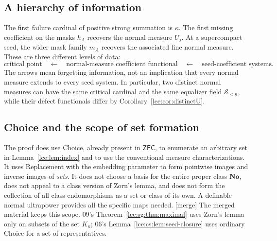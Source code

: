 \documentclass[11pt,letterpaper]{article}
\numberwithin{equation}{section}
\theoremstyle{definition}
\theoremstyle{remark}
\newcommand{\No}{\mathbf{No}}
\newcommand{\Sk}{\mathscr S_{<\kappa}}
\newcommand{\ZFC}{\mathsf{ZFC}}
\newcommand{\thref}[1]{Theorem~\ref{#1}}
\newcommand{\leref}[1]{Lemma~\ref{#1}}
\newcommand{\mergetag}{\textup{\textsf{\small[merge]}}}%
\begin{document}
\subsection{A hierarchy of information}
The first failure cardinal of positive strong summation is $\kappa$.
The first missing coefficient on the masks $h_A$ recovers the normal
measure $U_j$. At a supercompact seed, the wider mask family $m_A$
recovers the associated fine normal measure. These are three different
levels of data:
\[
 \text{critical point}
 \quad\longleftarrow\quad
 \text{normal-measure coefficient functional}
 \quad\longleftarrow\quad
 \text{seed-coefficient systems}.
\]
The arrows mean forgetting information, not an implication that every
normal measure extends to every seed system. In particular, two distinct
normal measures can have the same critical cardinal and the same equalizer
field $\Sk$, while their defect functionals differ by
Corollary~\ref{lce:cor:distinctU}.

\subsection{Choice and the scope of set formation}
The proof does use Choice, already present in $\ZFC$, to enumerate an
arbitrary set in \leref{lce:lem:index} and to use the conventional measure
characterizations. It uses Replacement with the embedding parameter to
form pointwise images and inverse images of \emph{sets}. It does not
choose a basis for the entire proper class $\No$, does not appeal to a
class version of Zorn's lemma, and does not form the collection of all
class endomorphisms as a set or class of its own. A definable normal
ultrapower provides all the specific maps needed.
\mergetag{} The merged material keeps this scope. 09's
\thref{lce:sg:thm:maximal} uses Zorn's lemma only on subsets of the set
$K_\kappa$; 06's \leref{lce:cs:lem:seed-closure} uses ordinary Choice for a
set of representatives.
\end{document}
